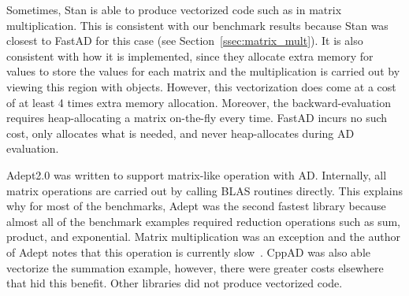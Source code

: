 Sometimes, Stan is able to produce vectorized code such as in matrix multiplication.
This is consistent with our benchmark results because Stan was closest to FastAD
for this case (see Section~\ref{ssec:matrix_mult}).
It is also consistent with how it is implemented,
since they allocate extra memory for  values to store the values for each matrix 
and the multiplication is carried out by viewing this region with  objects.
However, this vectorization does come at a cost of at least 4 times extra memory allocation.
Moreover, the backward-evaluation requires heap-allocating a matrix on-the-fly every time.
FastAD incurs no such cost, only allocates what is needed, and never heap-allocates during AD evaluation.

Adept2.0 was written to support matrix-like operation with AD.\@
Internally, all matrix operations are carried out by calling BLAS routines directly.
This explains why for most of the benchmarks, Adept was the second fastest library
because almost all of the benchmark examples required 
reduction operations such as sum, product, and exponential.
Matrix multiplication was an exception and
the author of Adept notes that this operation is currently slow~\cite{hogan:2014}.
CppAD was also able vectorize the summation example,
however, there were greater costs elsewhere that hid this benefit.
Other libraries did not produce vectorized code.
